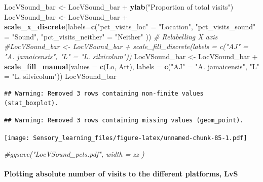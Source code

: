 \documentclass[]{article}
\newenvironment{Shaded}{\begin{snugshade}}{\end{snugshade}}
\newcommand{\KeywordTok}[1]{\textcolor[rgb]{0.13,0.29,0.53}{\textbf{{#1}}}}
\newcommand{\DataTypeTok}[1]{\textcolor[rgb]{0.13,0.29,0.53}{{#1}}}
\newcommand{\StringTok}[1]{\textcolor[rgb]{0.31,0.60,0.02}{{#1}}}
\newcommand{\CommentTok}[1]{\textcolor[rgb]{0.56,0.35,0.01}{\textit{{#1}}}}
\newcommand{\NormalTok}[1]{{#1}}
\let\oldparagraph\paragraph
\renewcommand{\paragraph}[1]{\oldparagraph{#1}\mbox{}}
\begin{document}
\begin{Shaded}
\begin{Highlighting}[]
\NormalTok{LocVSound_bar <-}\StringTok{ }\NormalTok{LocVSound_bar +}\StringTok{ }\KeywordTok{ylab}\NormalTok{(}\StringTok{"Proportion of total visits"}\NormalTok{)}
\NormalTok{LocVSound_bar <-}\StringTok{ }\NormalTok{LocVSound_bar +}\StringTok{ }\KeywordTok{scale_x_discrete}\NormalTok{(}\DataTypeTok{labels=}\KeywordTok{c}\NormalTok{(}\StringTok{"pct_visits_loc"} \NormalTok{=}\StringTok{ "Location"}\NormalTok{, }\StringTok{"pct_visits_sound"} \NormalTok{=}\StringTok{ "Sound"}\NormalTok{,}
                              \StringTok{"pct_visits_neither"} \NormalTok{=}\StringTok{ "Neither"} \NormalTok{))  }\CommentTok{# Relabelling X axis}
\CommentTok{#LocVSound_bar <- LocVSound_bar + scale_fill_discrete(labels = c("AJ" = "A. jamaicensis", "L" = "L. silvicolum"))}
\NormalTok{LocVSound_bar <-}\StringTok{ }\NormalTok{LocVSound_bar +}\StringTok{ }\KeywordTok{scale_fill_manual}\NormalTok{(}\DataTypeTok{values =} \KeywordTok{c}\NormalTok{(Lo, Art), }\DataTypeTok{labels =} \KeywordTok{c}\NormalTok{(}\StringTok{"AJ"} \NormalTok{=}\StringTok{ "A. jamaicensis"}\NormalTok{, }\StringTok{"L"} \NormalTok{=}\StringTok{ "L. silvicolum"}\NormalTok{))}
\NormalTok{LocVSound_bar}
\end{Highlighting}
\end{Shaded}

\begin{verbatim}
## Warning: Removed 3 rows containing non-finite values (stat_boxplot).
\end{verbatim}

\begin{verbatim}
## Warning: Removed 3 rows containing missing values (geom_point).
\end{verbatim}

\texttt{[image: Sensory\_learning\_files/figure-latex/unnamed-chunk-85-1.pdf]}

\begin{Shaded}
\begin{Highlighting}[]
\CommentTok{#ggsave("LocVSound_pcts.pdf", width = zz  )}
\end{Highlighting}
\end{Shaded}

\paragraph{Plotting absolute number of visits to the different
platforms,
LvS}\label{plotting-absolute-number-of-visits-to-the-different-platforms-lvs-1}
\end{document}
